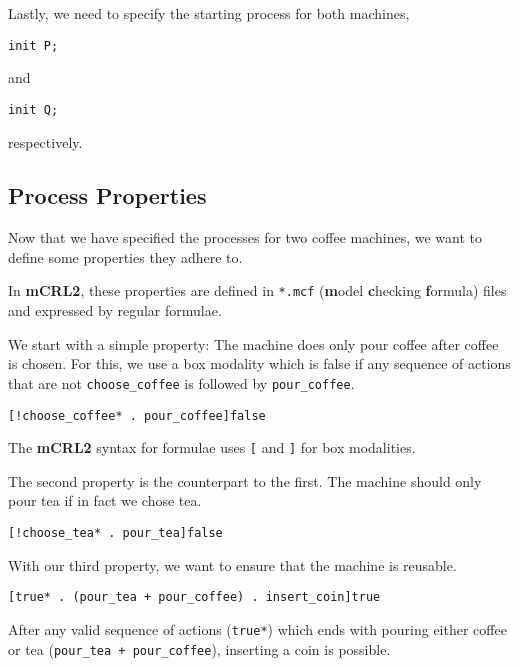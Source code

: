 \documentclass{clseminar}
\begin{document}
  Lastly, we need to specify the starting process for both machines,

  \begin{lstlisting}[language=mCRL2]
init P;
  \end{lstlisting}

  and

  \begin{lstlisting}[language=mCRL2]
init Q;
  \end{lstlisting}

  respectively.

  \subsection{Process Properties}

  Now that we have specified the processes for two coffee machines, we want to define some properties they adhere to.

  In \textbf{mCRL2}, these properties are defined in \texttt{*.mcf} (\textbf{m}odel \textbf{c}hecking \textbf{f}ormula) files and expressed by regular formulae.

  We start with a simple property: The machine does only pour coffee after coffee is chosen. For this, we use a box modality which is false if any sequence of actions that are not \texttt{choose\_coffee} is followed by \texttt{pour\_coffee}.

  \begin{lstlisting}[language=mCRL2]
[!choose_coffee* . pour_coffee]false
  \end{lstlisting}

  The \textbf{mCRL2} syntax for formulae uses \texttt{[} and \texttt{]} for box modalities.

  The second property is the counterpart to the first. The machine should only pour tea if in fact we chose tea.

  \begin{lstlisting}[language=mCRL2]
[!choose_tea* . pour_tea]false
  \end{lstlisting}

  With our third property, we want to ensure that the machine is reusable.

  \begin{lstlisting}[language=mCRL2]
[true* . (pour_tea + pour_coffee) . insert_coin]true
  \end{lstlisting}

  After any valid sequence of actions (\texttt{true*}) which ends with pouring either coffee or tea (\texttt{pour\_tea + pour\_coffee}), inserting a coin is possible.
\end{document}

